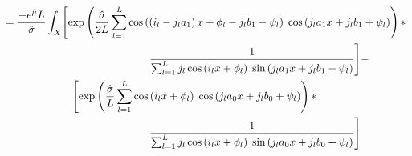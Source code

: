\documentclass[12pt,dvipsnames]{report}
\begin{document}
\begin{align}
&= \frac{-e^{\hat{\mu}} L}{\hat{\sigma}} \int_X \Biggl[ \exp\left( \frac{\hat{\sigma}}{2L} \sum_{l=1}^L \cos\left( \left( i_l - j_l a_1 \right) x + \phi_l - j_l b_1 - \psi_l \right) \; \cos\left( j_l a_1 x + j_l b_1 + \psi_l \right) \right) * \nonumber \\
& \hspace{1.9in} \frac{1}{\sum_{l=1}^L j_l \cos\left( i_l x + \phi_l \right) \; \sin\left( j_l a_1 x + j_l b_1 + \psi_l \right)} \Biggr] - \nonumber \\
& \hspace{0.9in} \Biggl[ \exp\left( \frac{\hat{\sigma}}{L} \sum_{l=1}^L \cos\left( i_l x + \phi_l \right) \; \cos\left( j_l a_0 x + j_l b_0 + \psi_l \right) \right) * \nonumber \\
& \hspace{1.9in} \frac{1}{\sum_{l=1}^L j_l \cos\left( i_l x + \phi_l \right) \; \sin\left( j_l a_0 x + j_l b_0 + \psi_l \right)} \Biggr] \\
\end{align}
\fi



\end{document}
